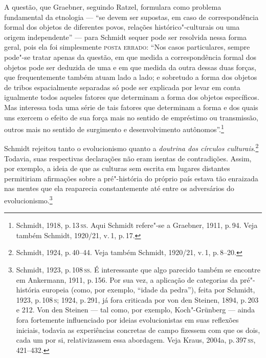 A questão, que Graebner, seguindo Ratzel, formulara como problema
fundamental da etnologia --- ``se devem ser supostas, em caso de
correspondência formal dos objetos de diferentes povos, relações
histórico"-culturais ou uma origem independente'' --- para Schmidt sequer
pode ser resolvida nessa forma geral, pois ela foi simplesmente \textsc{posta
errado}: ``Nos casos particulares, sempre pode"-se tratar apenas da
questão, em que medida a correspondência formal dos objetos pode ser
deduzida de uma e em que medida da outra dessas duas forças, que
frequentemente também atuam lado a lado; e sobretudo a forma dos objetos
de tribos espacialmente separadas só pode ser explicada por levar em
conta igualmente todos aqueles fatores que determinam a forma dos
objetos específicos. Mas interessa toda uma série de tais fatores que
determinam a forma e dos quais uns exercem o efeito de sua força mais no
sentido de empréstimo ou transmissão, outros mais no sentido de
surgimento e desenvolvimento autônomos''.\footnote{Schmidt, 1918, p.\,13\,\textsc{ss}. Aqui Schmidt refere"-se a Graebner, 1911, p.\,94. Veja também
  Schmidt, 1920/21, v.\,1, p.\,17.}

Schmidt rejeitou tanto o evolucionismo quanto a \textit{doutrina dos círculos
culturais}.\footnote{Schmidt, 1924, p.\,40--44. Veja também Schmidt,
  1920/21, v.\,1, p.\,8--20.} Todavia, suas respectivas declarações não
eram isentas de contradições. Assim, por exemplo, a ideia de que as
culturas sem escrita em lugares distantes permitiriam afirmações sobre a
pré"-história do próprio país estava tão enraizada nas mentes que ela
reaparecia constantemente até entre os adversários do
evolucionismo.\footnote{Schmidt, 1923, p.\,108\,\textsc{ss}. É interessante que
  algo parecido também se encontre em Ankermann, 1911, p.\,156. Por sua
  vez, a aplicação de categorias da pré"-história europeia (como, por
  exemplo, ``idade da pedra''), feita por Schmidt, 1923, p.\,108\,\textsc{s}; 1924,
  p.\,291, já fora criticada por von den Steinen, 1894, p.\,203 e 212.
  Von den Steinen --- tal como, por exemplo, Koch"-Grünberg --- ainda fora
  fortemente influenciado por ideias evolucionistas em suas reflexões
  iniciais, todavia as experiências concretas de campo fizessem com que
  os dois, cada um por si, relativizassem essa abordagem. Veja Kraus,
  2004a, p.\,397\,\textsc{ss}, 421--432.}

